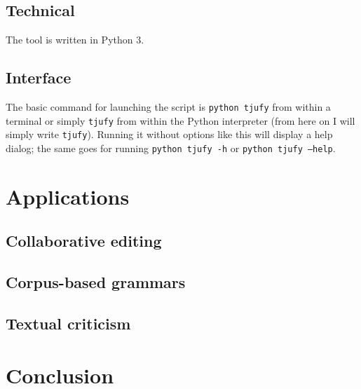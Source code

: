 \documentclass[10pt,a4paper,twoside,openright,titlepage,fleqn,%
               headinclude,,footinclude,BCOR5mm,%
               numbers=noenddot,cleardoublepage=empty,%
               tablecaptionabove]{scrbook}
\begin{document}
\section{Technical} %
\label{sec:tool-technical}
The tool is written in Python 3. 

\section{Interface} %
\label{sec:interface}

The basic command for launching the script is \texttt{python tjufy} from within
a terminal or simply \texttt{tjufy} from within the Python interpreter (from
here on I will simply write \texttt{tjufy}). Running it without options like this
will display a help dialog; the same goes for running \texttt{python tjufy -h}
or \texttt{python tjufy --help}.



\chapter{Applications} %
\label{cha:applications}

\section{Collaborative editing} %
\label{sec:collaborativeediting}


\section{Corpus-based grammars} %
\label{sec:corpusbasedgrammars}


\section{Textual criticism} %
\label{sec:textualcriticism}



\chapter{Conclusion} %
\label{cha:conclusion}


\backmatter
\clearpage

%
\end{document}
